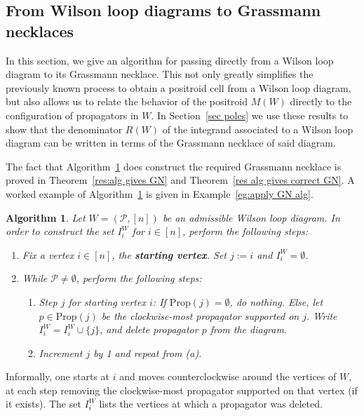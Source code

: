 \documentclass[11pt]{article}
\newcommand{\cP}{\mathcal{P}}
\newcommand{\Prop}{\textrm{Prop}}
\newtheorem{algorithm}[thm]{Algorithm}
\theoremstyle{remark}
\theoremstyle{definition}
\begin{document}
\subsection{From Wilson loop diagrams to Grassmann necklaces}\label{sec:GN alg}

In this section, we give an algorithm for passing directly from a Wilson loop diagram to its Grassmann necklace. This not only greatly simplifies the previously known process to obtain a positroid cell from a Wilson loop diagram, but also allows us to relate the behavior of the positroid $M(W)$ directly to the configuration of propagators in $W$. In Section~\ref{sec poles} we use these results to show that the denominator $R(W)$ of the integrand associated to a Wilson loop diagram can be written in terms of the Grassmann necklace of said diagram. 

The fact that Algorithm~\ref{alg:put GN on WLD} does construct the required Grassmann necklace is proved in Theorem~\ref{res:alg gives GN} and Theorem~\ref{res alg gives correct GN}. A worked example of Algorithm~\ref{alg:put GN on WLD} is given in Example~\ref{eg:apply GN alg}.

\begin{algorithm}\label{alg:put GN on WLD}
Let $W = (\cP, [n])$ be an admissible Wilson loop diagram. In order to construct the set $I_i^W$ for $i \in [n]$, perform the following steps:

\begin{enumerate}
\item Fix a vertex $i \in [n]$, the {\bf starting vertex}. Set $j:=i$ and $I_i^W = \emptyset$.
\item While $\cP \neq \emptyset$, perform the following steps:
\begin{enumerate}
\item {\em Step $j$ for starting vertex $i$}: If $\Prop(j) = \emptyset$, do nothing. Else, let $p \in \Prop(j)$ be the clockwise-most propagator supported on $j$. Write $I_i^W = I_i^W\cup \{j\}$, and delete propagator $p$ from the diagram.
\item Increment $j$ by 1 and repeat from (a).
\end{enumerate}
\end{enumerate}
\end{algorithm}

Informally, one starts at $i$ and moves counterclockwise around the vertices of $W$, at each step removing the clockwise-most propagator supported on that vertex (if it exists). The set $I_i^W$ lists the vertices at which a propagator was deleted. 
\end{document}
